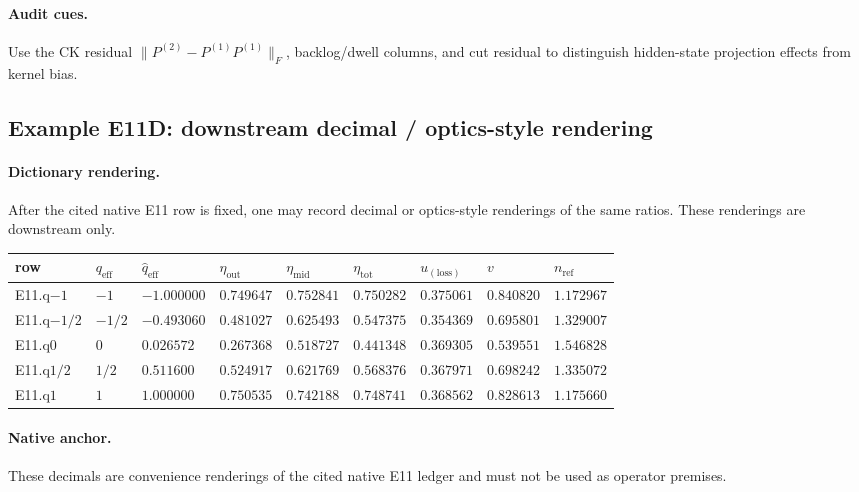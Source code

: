 \paragraph{Audit cues.} Use the CK residual $\|P^{(2)}-P^{(1)}P^{(1)}\|_F$, backlog/dwell columns, and cut residual to distinguish hidden-state projection effects from kernel bias.

\subsection{Example E11D: downstream decimal / optics-style rendering}\label{app:e11-dict}
\paragraph{Dictionary rendering.} After the cited native E11 row is fixed, one may record decimal or optics-style renderings of the same ratios. These renderings are downstream only.
{\footnotesize
\begin{center}
\begin{tabular}{@{}lllllllll@{}}
\toprule
row & $q_{\mathrm{eff}}$ & $\widehat q_{\mathrm{eff}}$ & $\eta_{\mathrm{out}}$ & $\eta_{\mathrm{mid}}$ & $\eta_{\mathrm{tot}}$ & $u_{(\mathrm{loss})}$ & $v$ & $n_{\mathrm{ref}}$ \\
\midrule
E11.q$-1$ & $-1$ & $-1.000000$ & $0.749647$ & $0.752841$ & $0.750282$ & $0.375061$ & $0.840820$ & $1.172967$ \\
E11.q$-1/2$ & $-1/2$ & $-0.493060$ & $0.481027$ & $0.625493$ & $0.547375$ & $0.354369$ & $0.695801$ & $1.329007$ \\
E11.q$0$ & $0$ & $0.026572$ & $0.267368$ & $0.518727$ & $0.441348$ & $0.369305$ & $0.539551$ & $1.546828$ \\
E11.q$1/2$ & $1/2$ & $0.511600$ & $0.524917$ & $0.621769$ & $0.568376$ & $0.367971$ & $0.698242$ & $1.335072$ \\
E11.q$1$ & $1$ & $1.000000$ & $0.750535$ & $0.742188$ & $0.748741$ & $0.368562$ & $0.828613$ & $1.175660$ \\
\bottomrule
\end{tabular}
\end{center}}
\paragraph{Native anchor.} These decimals are convenience renderings of the cited native E11 ledger and must not be used as operator premises.
